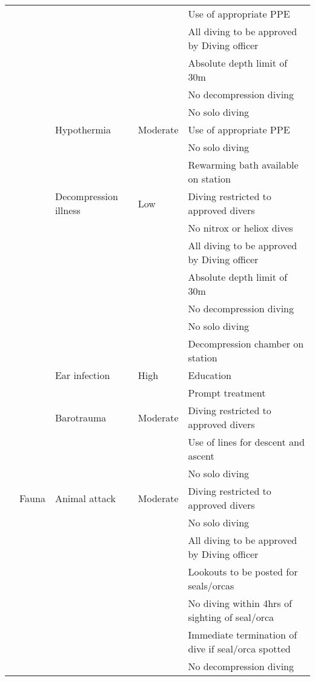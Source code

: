 \documentclass[12pt,a4paper]{article}
\begin{document}
\begin{landscape}
\begin{longtable}{lllll}
         &  &  &  & Use of appropriate PPE \\
         &  &  &  & All diving to be approved by Diving officer \\
         &  &  &  & Absolute depth limit of 30m \\
         &  &  &  & No decompression diving \\
         &  &  &  & No solo diving \\
         &  & Hypothermia & Moderate & Use of appropriate PPE \\
         &  &  &  & No solo diving \\
         &  &  &  & Rewarming bath available on station \\
         &  & Decompression illness & Low & Diving restricted to approved divers \\
         &  &  &  & No nitrox or heliox dives \\
         &  &  &  & All diving to be approved by Diving officer \\
         &  &  &  & Absolute depth limit of 30m \\
         &  &  &  & No decompression diving \\
         &  &  &  & No solo diving \\
         &  &  &  & Decompression chamber on station \\
         &  & Ear infection & High & Education \\
         &  &  &  & Prompt treatment \\
         &  & Barotrauma & Moderate & Diving restricted to approved divers \\
         &  &  &  & Use of lines for descent and ascent \\
         &  &  &  & No solo diving \\
         & Fauna & Animal attack & Moderate & Diving restricted to approved divers \\
         &  &  &  & No solo diving \\
         &  &  &  & All diving to be approved by Diving officer \\
         &  &  &  & Lookouts to be posted for seals/orcas \\
         &  &  &  & No diving within 4hrs of sighting of seal/orca \\
         &  &  &  & Immediate termination of dive if seal/orca spotted \\
         &  &  &  & No decompression diving \\
        \midrule

\end{longtable}
\end{landscape}
\end{document}
